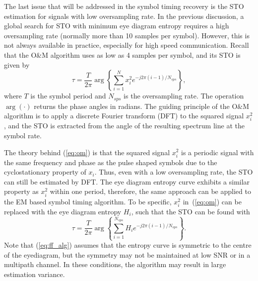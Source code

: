 \documentclass[12pt, draftclsnofoot, onecolumn]{IEEEtran}
\begin{document}
The last issue that will be addressed in the symbol timing recovery is the STO estimation for signals with low oversampling rate.
In the previous discussion, a global search for STO with minimum eye diagram entropy requires a high oversampling rate (normally more than 10 samples per symbol).
However, this is not always available in practice, especially for high speed communication.
Recall that 
the O\&M algorithm uses as low as 4 samples per symbol, and its STO is given by
\begin{equation}
\tau=\frac{T}{2\pi}\arg \left\{ {\sum\limits_{i = 1}^{N} {x_i^2{e^{ - j2\pi (i-1)/N_{sps}}}} } \right\},
\label{eq:om}
\end{equation}
where \(T\) is the symbol period and \(N_{sps}\) is the oversampling rate.
The operation \(\arg( \cdot )\) returns the phase angles in radians.
The guiding principle of the O\&M algorithm is to apply a discrete Fourier transform (DFT) to the squared signal \(x_i^2\),
and the STO is extracted from the angle of the resulting spectrum line at the symbol rate.

The theory behind (\ref{eq:om}) is that the squared signal \(x_i^2\) is a periodic signal with the same frequency and phase as the pulse shaped symbols due to the cyclostationary property of \(x_i\).
Thus, even with a low oversampling rate, the STO can still be estimated by DFT.
The eye diagram entropy curve exhibits a similar property as \(x_i^2\) within one period,
therefore, the same approach can be applied to the EM based symbol timing algorithm.
% 
% 
To be specific, \(x_i^2\) in~(\ref{eq:om}) can be replaced  with the eye diagram entropy \(H_i\), 
such that the STO can be found with
\begin{equation}
\tau  = \frac{T}{{2\pi }}\arg \left\{ {\sum\limits_{i = 1}^{N_{sps}} {H_i{e^{ - j2\pi (i-1)/N_{sps}}}} } \right\}.
\label{eq:ff_alg}
\end{equation}
Note that (\ref{eq:ff_alg}) assumes that the entropy curve is symmetric to the centre of the eyediagram,
but the symmetry may not be maintained at low SNR or in a multipath channel.
In these conditions, the algorithm may result in large estimation variance.
\end{document}
